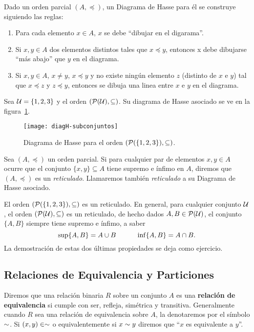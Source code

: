 \begin{definicion}
Dado un orden parcial $(A,\preceq)$, un Diagrama de Hasse para él se construye siguiendo las reglas:
\begin{enumerate}
  \itemsep 0pt
  \item Para cada elemento $x\in A$, $x$ se debe ``dibujar en el digarama''.
  \item Si $x,y\in A$ dos elementos distintos tales que $x\preceq y$, entonces x debe dibujarse ``más abajo'' que $y$ en el diagrama.
  \item Si $x,y\in A$, $x\not=y$, $x\preceq y$ y no existe ningún elemento $z$ (distinto de $x$ e $y$) tal que $x\preceq z$ y $z\preceq y$, entonces se dibuja una linea entre $x$ e $y$ en el diagrama.
\end{enumerate}
\end{definicion}

\begin{ejemplo}
Sea $\U=\{1,2,3\}$ y el orden $(\P(\U),\subseteq)$.
Su diagrama de Hasse asociado se ve en la figura~\ref{fig:diagH-subconjuntos}.

\begin{figure}[h!]
\centering
\texttt{[image: diagH-subconjuntos]}
\caption{Diagrama de Hasse para el orden $(\P(\{1,2,3\}),\subseteq)$.}
\label{fig:diagH-subconjuntos}
\end{figure}
\end{ejemplo}

\begin{definicion}
Sea $(A,\preceq)$ un orden parcial.
Si para cualquier par de elementos $x,y\in A$ ocurre que el conjunto $\{x,y\}\subseteq A$ tiene supremo e ínfimo en $A$, diremos que $(A,\preceq)$ es un \emph{reticulado}.
Llamaremos también \emph{reticulado} a su Diagrama de Hasse asociado.
\end{definicion}

\begin{ejemplo}
El orden $(\P(\{1,2,3\}),\subseteq)$ es un reticulado.
En general, para cualquier conjunto $\U$, el orden $(\P(\U),\subseteq)$ es un reticulado,
de hecho dados $A,B\in\P(\U)$, el conjunto $\{A,B\}$ siempre tiene supremo e ínfimo, a saber \[\sup\{A,B\}=A\cup B \hspace*{3em} \inf\{A,B\}=A\cap B.\]
La demostración de estas dos últimas propiedades se deja como ejercicio.
\end{ejemplo}


\subsection{Relaciones de Equivalencia y Particiones}
\begin{definicion}
Diremos que una relación binaria $R$ sobre un conjunto $A$ es una {\bf relación de equivalencia} si cumple con ser, refleja, simétrica y transitiva.
Generalmente cuando $R$ sea una relación de equivalencia sobre $A$, la denotaremos por el símbolo $\eqr$.
Si $(x,y)\in\eqr$ o equivalentemente si $x\eqr y$ diremos que ``$x$ es equivalente a $y$''.
\end{definicion}

